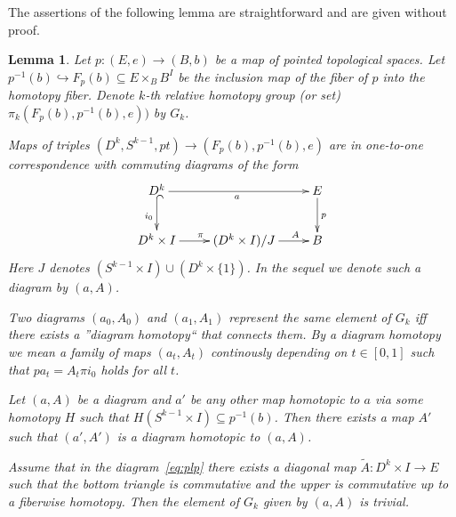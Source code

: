 \documentclass[oneside, 12pt]{amsart}
\theoremstyle{plain}
\numberwithin{equation}{section}
\newtheorem{lemma}{Lemma}
\numberwithin{lemma}{section}
\theoremstyle{remark}
\theoremstyle{definition}
\begin{document}
The assertions of the following lemma are straightforward and are given without proof.
\begin{lemma} \label{lem:topo-facts} Let $p\colon (E, e) \to (B, b)$ be a map of pointed topological spaces.
Let $p^{-1}(b) \hookrightarrow F_{p}(b) \subseteq E\times_B B^I$ be the inclusion map of the fiber of $p$ into the homotopy fiber.
Denote $k$-th relative homotopy group (or set) $\pi_k(F_p(b), p^{-1}(b), e))$ by $G_k$.
\begin{lemlist}
 \item Maps of triples $(D^k, S^{k-1}, pt) \to (F_p(b), p^{-1}(b), e)$ are in one-to-one correspondence with commuting diagrams of the form
   \begin{equation} \xymatrix{ 
    D^k \ar@{^{(}->}_{i_0}[d]  \ar_{a}[rr] & & E \ar^{p}[d]  \\
    D^k\times I \ar^{\pi}[r] & (D^k \times I) / J \ar^(.7){A}[r] & B}
    \label{eq:plp} \end{equation}
    Here $J$ denotes $(S^{k-1} \times I) \cup (D^k \times \{1\})$. In the sequel we denote such a diagram by $(a, A)$.
 \item Two diagrams $(a_0, A_0)$ and $(a_1, A_1)$ represent the same element of $G_k$ iff there exists a ''diagram homotopy`` that connects them.
     By a diagram homotopy we mean a family of maps $(a_t, A_t)$ continously depending on $t\in [0, 1]$ such that $pa_t = A_t \pi i_0$ holds for all $t$.
 \item \label{item:continue} Let $(a, A)$ be a diagram and $a'$ be any other map 
     homotopic to $a$ via some homotopy $H$ such that $H(S^{k-1}\times I) \subseteq p^{-1}(b)$.
     Then there exists a map $A'$ such that $(a', A')$ is a diagram homotopic to $(a, A)$.
 \item \label{item:weaker} 
     Assume that in the diagram~\eqref{eq:plp} there exists a diagonal map $\widetilde{A} \colon D^k\times I \to E$ 
     such that the bottom triangle is commutative and the upper is commutative up to a fiberwise homotopy.
     Then the element of $G_k$ given by $(a, A)$ is trivial.
\end{lemlist}
\end{lemma}
\begin{comment}
 Denote by $H$ the fiberwise homotopy between $a$ and $\widetilde{A}i_0$.
 Consider the following family of diagrams:
 \[ a_t(x) = \left\{\def\arraystretch{1.2}%
  \begin{array}{@{}c@{\quad}l@{}}
    H(x, 2t)               & 0\leq t\leq \frac{1}{2}\\
    \widetilde{A}(x, 2t-1) & \frac{1}{2}\leq t \leq 1\end{array}\right.;\  \
  A_t(x, s) = \left\{\def\arraystretch{1.2}%
  \begin{array}{@{}c@{\quad}l@{}}
    A(x, s)                & 0\leq t\leq \frac{1}{2} \\
    A(x, s + (2t-1)(1-s)) &  \frac{1}{2}\leq t \leq 1
  \end{array}\right.\]
 It is clear that $a_0=a$ and $A_0=A$ while the image of $a_1$ is contained in $p^{-1}(b)$.
\end{comment}
\end{document}
